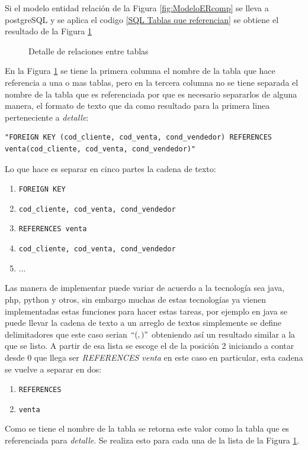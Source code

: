 Si el modelo entidad relaci\'on de la Figura \ref{fig:ModeloERcomp} se lleva a postgreSQL y se aplica el codigo \ref{SQL Tablas que referencian} se obtiene el resultado de la Figura \ref{fig:referenciasModeloComp}

\begin{figure}[H]
\centering
{}
\caption{Detalle de relaciones entre tablas} \label{fig:referenciasModeloComp}
\end{figure}

En la Figura \ref{fig:referenciasModeloComp} se tiene la primera columna el nombre de la tabla que hace referencia a una o mas tablas, pero en la tercera columna no se tiene separada el nombre de la tabla que es referenciada por que es necesario separarlos de alguna manera, el formato de texto que da como resultado para la primera linea perteneciente a \textit{detalle}:
\lstset{language=sql,breaklines=true}
\begin{lstlisting}
"FOREIGN KEY (cod_cliente, cod_venta, cond_vendedor) REFERENCES venta(cod_cliente, cod_venta, cond_vendedor)"
\end{lstlisting}
Lo que hace es separar en cinco partes la cadena de texto:
\begin{enumerate}
\item \texttt{FOREIGN KEY}
\item \texttt{cod\_cliente, cod\_venta, cond\_vendedor}
\item \texttt{REFERENCES venta}
\item \texttt{cod\_cliente, cod\_venta, cond\_vendedor}
\item ...
\end{enumerate}
Las manera de implementar puede variar de acuerdo a la tecnolog\'ia sea java, php, python y otros, sin embargo muchas de estas tecnolog\'ias ya vienen implementadas estas funciones para hacer estas tareas, por ejemplo en java se puede llevar la cadena de texto a un arreglo de textos simplemente se define delimitadores que este caso serian $`` (  ,  )  "$   obteniendo as\'i un resultado similar a la que se listo. A partir de esa lista se escoge el de la posici\'on 2 iniciando a contar desde 0 que llega ser \textit{REFERENCES venta} en este caso en particular, esta cadena se vuelve a separar en dos:
\begin{enumerate}
\item \texttt{REFERENCES}
\item \texttt{venta}
\end{enumerate}
Como se tiene el nombre de la tabla se retorna este valor como la tabla que es referenciada para \textit{detalle}. Se realiza esto para cada una de la lista de la Figura \ref{fig:referenciasModeloComp}.

